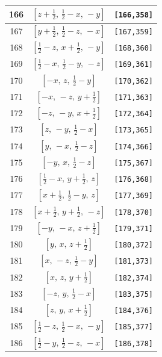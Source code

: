 \documentclass[fleqn,8pt]{jsarticle}
\begin{document}
\begin{longtable}{ccc}
166 & $\left[ z + \frac{1}{2},\, \frac{1}{2} - x,\, - y \right]$ & {\tt [166,358]} \\ \hline
167 & $\left[ y + \frac{1}{2},\, \frac{1}{2} - z,\, - x \right]$ & {\tt [167,359]} \\ \hline
168 & $\left[ \frac{1}{2} - z,\, x + \frac{1}{2},\, - y \right]$ & {\tt [168,360]} \\ \hline
169 & $\left[ \frac{1}{2} - x,\, \frac{1}{2} - y,\, - z \right]$ & {\tt [169,361]} \\ \hline
170 & $\left[ - x,\, z,\, \frac{1}{2} - y \right]$ & {\tt [170,362]} \\ \hline
171 & $\left[ - x,\, - z,\, y + \frac{1}{2} \right]$ & {\tt [171,363]} \\ \hline
172 & $\left[ - z,\, - y,\, x + \frac{1}{2} \right]$ & {\tt [172,364]} \\ \hline
173 & $\left[ z,\, - y,\, \frac{1}{2} - x \right]$ & {\tt [173,365]} \\ \hline
174 & $\left[ y,\, - x,\, \frac{1}{2} - z \right]$ & {\tt [174,366]} \\ \hline
175 & $\left[ - y,\, x,\, \frac{1}{2} - z \right]$ & {\tt [175,367]} \\ \hline
176 & $\left[ \frac{1}{2} - x,\, y + \frac{1}{2},\, z \right]$ & {\tt [176,368]} \\ \hline
177 & $\left[ x + \frac{1}{2},\, \frac{1}{2} - y,\, z \right]$ & {\tt [177,369]} \\ \hline
178 & $\left[ x + \frac{1}{2},\, y + \frac{1}{2},\, - z \right]$ & {\tt [178,370]} \\ \hline
179 & $\left[ - y,\, - x,\, z + \frac{1}{2} \right]$ & {\tt [179,371]} \\ \hline
180 & $\left[ y,\, x,\, z + \frac{1}{2} \right]$ & {\tt [180,372]} \\ \hline
181 & $\left[ x,\, - z,\, \frac{1}{2} - y \right]$ & {\tt [181,373]} \\ \hline
182 & $\left[ x,\, z,\, y + \frac{1}{2} \right]$ & {\tt [182,374]} \\ \hline
183 & $\left[ - z,\, y,\, \frac{1}{2} - x \right]$ & {\tt [183,375]} \\ \hline
184 & $\left[ z,\, y,\, x + \frac{1}{2} \right]$ & {\tt [184,376]} \\ \hline
185 & $\left[ \frac{1}{2} - z,\, \frac{1}{2} - x,\, - y \right]$ & {\tt [185,377]} \\ \hline
186 & $\left[ \frac{1}{2} - y,\, \frac{1}{2} - z,\, - x \right]$ & {\tt [186,378]} \\ \hline

\end{longtable}
\end{document}
